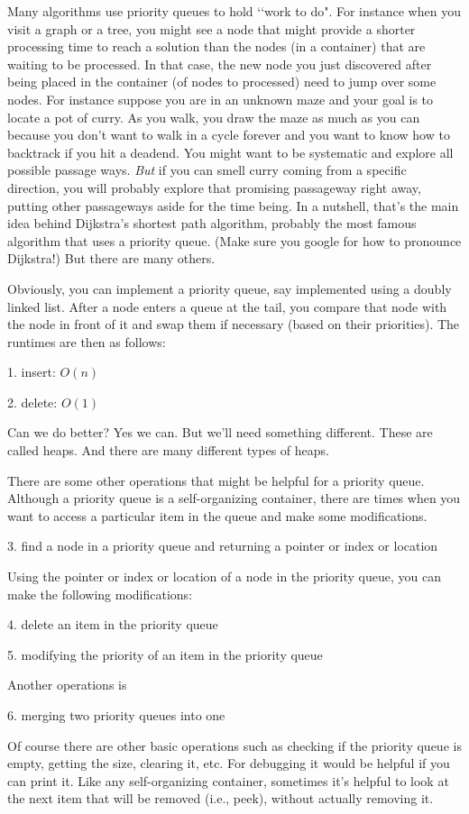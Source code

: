 Many algorithms use priority queues to hold 
\lq\lq work to do".
For instance when you visit a graph or a tree,
you might see a node that might provide
a shorter processing time to reach a solution
than the nodes (in a container) 
that are waiting to be processed.
In that case, the new node you just discovered
after being placed in the container (of nodes to 
processed)
need to jump over some nodes.
For instance suppose you are in an unknown maze
and your goal is to locate a pot of
curry. As you walk, you draw the maze as much as
you can because you don't want to walk in a
cycle forever and you want to know how to
backtrack if you hit a deadend.
You might want to be systematic and explore all
possible passage ways.
\textit{But}
if you can smell curry coming from a specific
direction, you will probably explore
that promising passageway right away, putting
other passageways aside for the time being.
In a nutshell, that's the main idea 
behind Dijkstra's shortest path algorithm, 
probably the most famous algorithm that uses
a priority queue.
(Make sure you google for how to pronounce
Dijkstra!)
But there are many others.

Obviously, you can implement a priority
queue, say implemented using a doubly linked list.
After a node enters a queue at the tail, you 
compare that node with the node in front of it
and swap them if necessary (based on their
priorities).
The runtimes are then as follows:
\begin{myenum}
  \item[1.] insert: $O(n)$
  \item[2.] delete: $O(1)$
\end{myenum}
Can we do better?
Yes we can. But we'll need something different.
These are called heaps.
And there are many different types of heaps.

There are some other operations that might be helpful
for a priority queue.
Although a priority queue is a self-organizing container,
there are times when you want to access a particular
item in the queue and make some modifications. 
\begin{myenum}
  \item[3.] find a node in a priority queue and returning a pointer or index or location
\end{myenum}
Using the pointer or index or location of a node in the priority queue, you can make the
following modifications:
\begin{myenum}
  \item[4.] delete an item in the priority queue 
  \item[5.] modifying the priority of an item in the priority queue 
\end{myenum}
Another operations is 
\begin{myenum}
  \item[6.] merging two priority queues into one
\end{myenum}
Of course there are other basic operations such as 
checking if the priority queue is empty, getting the size,
clearing it, etc.
For debugging it would be helpful if you can print it.
Like any self-organizing container, 
sometimes it's helpful to look at the next item that
will be removed (i.e., peek), without actually removing it.



